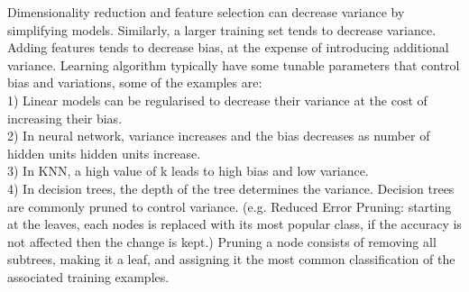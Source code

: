 Dimensionality reduction and feature selection can decrease variance by simplifying models. Similarly, a larger training set tends to decrease variance. Adding features tends to decrease bias, at the expense of introducing additional variance. Learning algorithm typically have some tunable parameters that control bias and variations, some of the examples are:\\

1) Linear models can be regularised to decrease their variance at the cost of increasing their bias.\\
2) In neural network, variance increases and the bias decreases as number of hidden units hidden units increase. \\
3) In KNN, a high value of k leads to high bias and low variance. \\
4) In decision trees, the depth of the tree determines the variance. Decision trees are commonly pruned to control variance. (e.g. Reduced Error Pruning: starting at the leaves, each nodes is replaced with its most popular class, if the accuracy is not affected then the change is kept.) Pruning a node consists of removing all subtrees, making it a leaf, and assigning it the most common classification of the associated training examples. 







